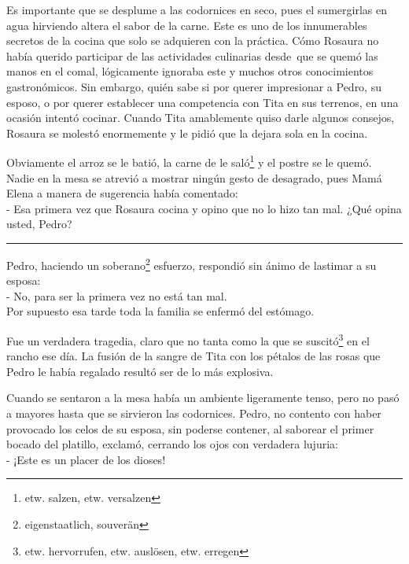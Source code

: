 Es importante que se desplume a las codornices en seco, pues el
sumergirlas en agua hirviendo altera el sabor de la carne. Este es uno
de los innumerables secretos de la cocina que solo se adquieren con la
práctica. Cómo Rosaura no había querido participar de las actividades
culinarias desde~que se quemó las manos en el comal, lógicamente
ignoraba este y muchos otros conocimientos gastronómicos. Sin embargo,
quién sabe si por querer impresionar a Pedro, su esposo, o por querer
establecer una competencia con Tita en sus terrenos, en una ocasión
intentó cocinar. Cuando Tita amablemente quiso darle algunos consejos,
Rosaura se molestó enormemente y le pidió que la dejara sola en la
cocina.

Obviamente el arroz se le batió, la carne de le saló\footnote{etw. salzen, etw. versalzen}
y el postre se le quemó. Nadie en la mesa se atrevió a mostrar ningún
gesto de desagrado, pues Mamá Elena a manera de sugerencia
había comentado:
\\- Esa primera vez que Rosaura cocina y opino que no lo hizo tan mal. %
¿Qué opina usted, Pedro?\\
\rule{1em}{0pt}Pedro, haciendo un soberano\footnote{eigenstaatlich, souverän} esfuerzo,
respondió sin ánimo de lastimar a su esposa:
\\- No, para ser la primera vez no está tan mal.\\

Por supuesto esa tarde toda la familia se enfermó del estómago.

Fue un verdadera tragedia, claro que no tanta como la que se suscitó\footnote{etw. hervorrufen, etw. auslösen, etw. erregen}
en el rancho ese día. La fusión de la sangre de Tita con los pétalos
de las rosas que Pedro le había regalado resultó ser de lo más explosiva.

Cuando se sentaron a la mesa había un ambiente ligeramente tenso, pero
no pasó a mayores hasta que se sirvieron las codornices. Pedro, no
contento con haber provocado los celos de su esposa, sin poderse
contener, al saborear el primer bocado del platillo, exclamó, cerrando
los ojos con verdadera lujuria:
\\- ¡Este es un placer de los dioses!\\

